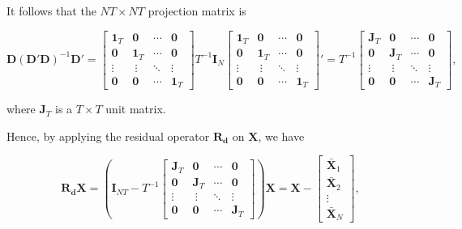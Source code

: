 \documentclass[
]{article}
\begin{document}
It follows that the \(NT \times NT\) projection matrix is

\[\boldsymbol{D}(\boldsymbol{D}'\boldsymbol{D})^{-1}\boldsymbol{D}' = \begin{bmatrix}\boldsymbol{1}_T & \boldsymbol{0} & \cdots & \boldsymbol{0} \\ \boldsymbol{0} & \boldsymbol{1}_T & \cdots & \boldsymbol{0} \\ \vdots &\ \vdots & \ddots & \vdots \\ \boldsymbol{0} & \boldsymbol{0} & \cdots & \boldsymbol{1}_T\end{bmatrix}T^{-1}\boldsymbol{I}_{N} \begin{bmatrix}\boldsymbol{1}_T & \boldsymbol{0} & \cdots & \boldsymbol{0} \\ \boldsymbol{0} & \boldsymbol{1}_T & \cdots & \boldsymbol{0} \\ \vdots &\ \vdots & \ddots & \vdots \\ \boldsymbol{0} & \boldsymbol{0} & \cdots & \boldsymbol{1}_T\end{bmatrix}'=T^{-1}\begin{bmatrix}\boldsymbol{J}_T & \boldsymbol{0} & \cdots & \boldsymbol{0} \\ \boldsymbol{0} & \boldsymbol{J}_T & \cdots & \boldsymbol{0} \\ \vdots &\ \vdots & \ddots & \vdots \\ \boldsymbol{0} & \boldsymbol{0} & \cdots & \boldsymbol{J}_T\end{bmatrix},\]

where \(\boldsymbol{J}_T\) is a \(T \times T\) unit matrix.

Hence, by applying the residual operator \(\boldsymbol{R_d}\) on
\(\boldsymbol{X}\), we have

\[\boldsymbol{R_dX} = \left(\boldsymbol{I}_{NT} - T^{-1}\begin{bmatrix}\boldsymbol{J}_T & \boldsymbol{0} & \cdots & \boldsymbol{0} \\ \boldsymbol{0} & \boldsymbol{J}_T & \cdots & \boldsymbol{0} \\ \vdots &\ \vdots & \ddots & \vdots \\ \boldsymbol{0} & \boldsymbol{0} & \cdots & \boldsymbol{J}_T\end{bmatrix}\right)\boldsymbol{X}=\boldsymbol{X}-\begin{bmatrix}\bar{\boldsymbol{X}}_1 \\ \bar{\boldsymbol{X}}_2 \\  \vdots \\ \bar{\boldsymbol{X}}_N \end{bmatrix},\]
\end{document}
